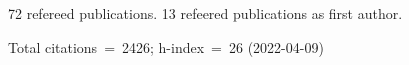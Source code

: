 72 refereed publications. 13 refeered publications as first author.

Total citations~=~2426; h-index~=~26 (2022-04-09)